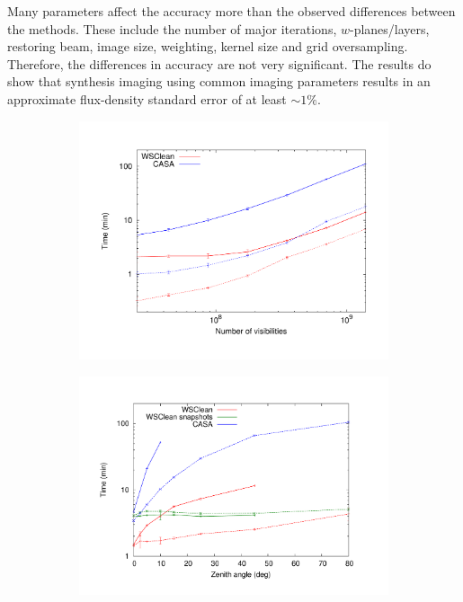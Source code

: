 \documentclass[useAMS,usenatbib]{mn2e}
\begin{document}
Many parameters affect the accuracy more than the observed differences between the methods. These include the number of major iterations, $w$-planes/layers, restoring beam, image size, weighting, kernel size and grid oversampling. Therefore, the differences in accuracy are not very significant. The results do show that synthesis imaging using common imaging parameters results in an approximate flux-density standard error of at least $\sim1\%$.

\begin{figure}%
\begin{subfigure}{.36\linewidth}%
\includegraphics[width=\linewidth]{img/benchmark-nsamples/nsamples}%
\caption{}\label{fig:timing-nsamples}%
\end{subfigure}%
\begin{subfigure}{.36\linewidth}%
\includegraphics[width=\linewidth]{img/benchmark-zenith-angle/za}%

\end{subfigure}
\end{figure}
\end{document}
